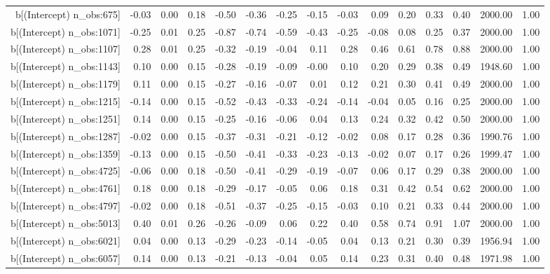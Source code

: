 \begin{table}[ht]
\begin{tabular}{rrrrrrrrrrrrrrr}
  b[(Intercept) n\_obs:675] & -0.03 & 0.00 & 0.18 & -0.50 & -0.36 & -0.25 & -0.15 & -0.03 & 0.09 & 0.20 & 0.33 & 0.40 & 2000.00 & 1.00 \\ 
  b[(Intercept) n\_obs:1071] & -0.25 & 0.01 & 0.25 & -0.87 & -0.74 & -0.59 & -0.43 & -0.25 & -0.08 & 0.08 & 0.25 & 0.37 & 2000.00 & 1.00 \\ 
  b[(Intercept) n\_obs:1107] & 0.28 & 0.01 & 0.25 & -0.32 & -0.19 & -0.04 & 0.11 & 0.28 & 0.46 & 0.61 & 0.78 & 0.88 & 2000.00 & 1.00 \\ 
  b[(Intercept) n\_obs:1143] & 0.10 & 0.00 & 0.15 & -0.28 & -0.19 & -0.09 & -0.00 & 0.10 & 0.20 & 0.29 & 0.38 & 0.49 & 1948.60 & 1.00 \\ 
  b[(Intercept) n\_obs:1179] & 0.11 & 0.00 & 0.15 & -0.27 & -0.16 & -0.07 & 0.01 & 0.12 & 0.21 & 0.30 & 0.41 & 0.49 & 2000.00 & 1.00 \\ 
  b[(Intercept) n\_obs:1215] & -0.14 & 0.00 & 0.15 & -0.52 & -0.43 & -0.33 & -0.24 & -0.14 & -0.04 & 0.05 & 0.16 & 0.25 & 2000.00 & 1.00 \\ 
  b[(Intercept) n\_obs:1251] & 0.14 & 0.00 & 0.15 & -0.25 & -0.16 & -0.06 & 0.04 & 0.13 & 0.24 & 0.32 & 0.42 & 0.50 & 2000.00 & 1.00 \\ 
  b[(Intercept) n\_obs:1287] & -0.02 & 0.00 & 0.15 & -0.37 & -0.31 & -0.21 & -0.12 & -0.02 & 0.08 & 0.17 & 0.28 & 0.36 & 1990.76 & 1.00 \\ 
  b[(Intercept) n\_obs:1359] & -0.13 & 0.00 & 0.15 & -0.50 & -0.41 & -0.33 & -0.23 & -0.13 & -0.02 & 0.07 & 0.17 & 0.26 & 1999.47 & 1.00 \\ 
  b[(Intercept) n\_obs:4725] & -0.06 & 0.00 & 0.18 & -0.50 & -0.41 & -0.29 & -0.19 & -0.07 & 0.06 & 0.17 & 0.29 & 0.38 & 2000.00 & 1.00 \\ 
  b[(Intercept) n\_obs:4761] & 0.18 & 0.00 & 0.18 & -0.29 & -0.17 & -0.05 & 0.06 & 0.18 & 0.31 & 0.42 & 0.54 & 0.62 & 2000.00 & 1.00 \\ 
  b[(Intercept) n\_obs:4797] & -0.02 & 0.00 & 0.18 & -0.51 & -0.37 & -0.25 & -0.15 & -0.03 & 0.10 & 0.21 & 0.33 & 0.44 & 2000.00 & 1.00 \\ 
  b[(Intercept) n\_obs:5013] & 0.40 & 0.01 & 0.26 & -0.26 & -0.09 & 0.06 & 0.22 & 0.40 & 0.58 & 0.74 & 0.91 & 1.07 & 2000.00 & 1.00 \\ 
  b[(Intercept) n\_obs:6021] & 0.04 & 0.00 & 0.13 & -0.29 & -0.23 & -0.14 & -0.05 & 0.04 & 0.13 & 0.21 & 0.30 & 0.39 & 1956.94 & 1.00 \\ 
  b[(Intercept) n\_obs:6057] & 0.14 & 0.00 & 0.13 & -0.21 & -0.13 & -0.04 & 0.05 & 0.14 & 0.23 & 0.31 & 0.40 & 0.48 & 1971.98 & 1.00 \\ 

\end{tabular}
\end{table}
